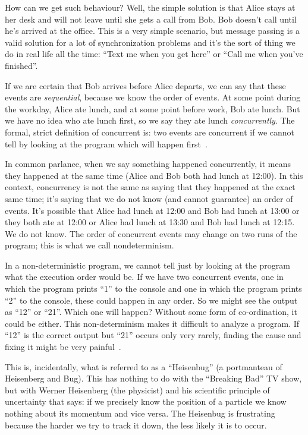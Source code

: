 \documentclass[a4paper]{report}
\begin{document}
How can we get such behaviour? Well, the simple solution is that Alice stays at her desk and will not leave until she gets a call from Bob. Bob doesn't call until he's arrived at the office. This is a very simple scenario, but message passing is a valid solution for a lot of synchronization problems and it's the sort of thing we do in real life all the time: ``Text me when you get here'' or ``Call me when you've finished''.

If we are certain that Bob arrives before Alice departs, we can say that these events are \textit{sequential}, because we know the order of events. At some point during the workday, Alice ate lunch, and at some point before work, Bob ate lunch. But we have no idea who ate lunch first, so we say they ate lunch \textit{concurrently}. The formal, strict definition of concurrent is: two events are concurrent if we cannot tell by looking at the program which will happen first~\cite{lbs}.

In common parlance, when we say something happened concurrently, it means they happened at the same time (Alice and Bob both had lunch at 12:00). In this context, concurrency is not the same as saying that they happened at the exact same time; it's saying that we do not know (and cannot guarantee) an order of events. It's possible that Alice had lunch at 12:00 and Bob had lunch at 13:00 or they both ate at 12:00 or Alice had lunch at 13:30 and Bob had lunch at 12:15. We do not know. The order of concurrent events may change on two runs of the program; this is what we call nondeterminism.

In a non-deterministic program, we cannot tell just by looking at the program what the execution order would be. If we have two concurrent events, one in which the program prints ``1'' to the console and one in which the program prints ``2'' to the console, these could happen in any order. So we might see the output as ``12'' or ``21''. Which one will happen? Without some form of co-ordination, it could be either. This non-determinism makes it difficult to analyze a program. If ``12'' is the correct output but ``21'' occurs only very rarely, finding the cause and fixing it might be very painful~\cite{lbs}.

This is, incidentally, what is referred to as a ``Heisenbug'' (a portmanteau of Heisenberg and Bug). This has nothing to do with the ``Breaking Bad'' TV show, but with Werner Heisenberg (the physicist) and his scientific principle of uncertainty that says: if we precisely know the position of a particle we know nothing about its momentum and vice versa. The Heisenbug is frustrating because the harder we try to track it down, the less likely it is to occur.
\end{document}

